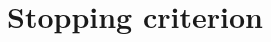 \documentclass[10pt,aspectratio=43]{beamer}
\newcommand\doublerulefill{
    \leavevmode\leaders\vbox{\hrule width .1pt\kern1pt\hrule}\hfill\kern0pt
    }
\newcommand{\mytheorem}[2]{
    \doublerulefill\ \framebox{\textbf{#1}}\ \doublerulefill
    \vspace{0.1cm}
    #2
    \doublerulefill
}
\begin{document}
\section{Stopping criterion}
\label{sec:Stopping_criterion}


\end{document}
